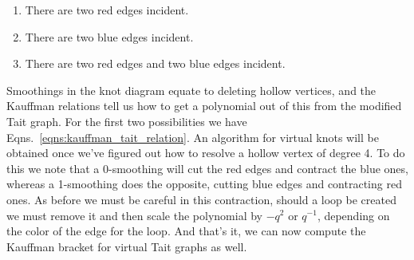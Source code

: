 \documentclass{article}
\theoremstyle{plain}
\begin{document}
        \begin{enumerate}
            \item There are two red edges incident.
            \item There are two blue edges incident.
            \item There are two red edges and two blue edges incident.
        \end{enumerate}
        Smoothings in the knot diagram equate to deleting hollow vertices,
        and the Kauffman relations tell us how to get a polynomial out of this
        from the modified Tait graph. For the first two possibilities we
        have Eqns.~\ref{eqns:kauffman_tait_relation}. An algorithm for
        virtual knots will be obtained once we've figured out how to
        resolve a hollow vertex of degree 4. To do this we note that
        a 0-smoothing will cut the red edges and contract the blue ones,
        whereas a 1-smoothing does the opposite, cutting blue edges and
        contracting red ones. As before we must be careful in this
        contraction, should a loop be created we must remove it and then
        scale the polynomial by $-q^{2}$ or $q^{-1}$, depending on the
        color of the edge for the loop. And that's it, we can now compute
        the Kauffman bracket for virtual Tait graphs as well.
        
        
\end{document}
